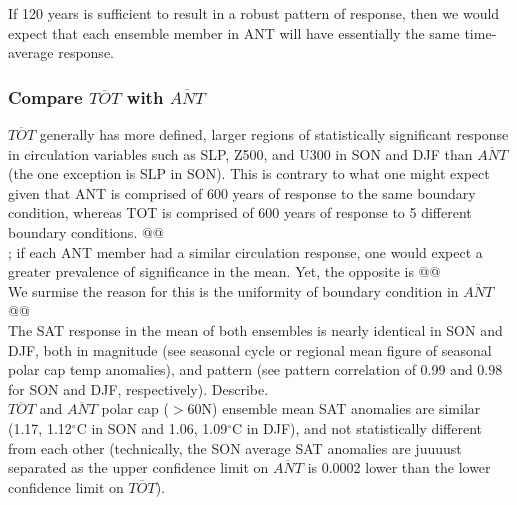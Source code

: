 \documentclass[twocol]{ametsoc}
\begin{document}
If 120 years is sufficient to result in a robust pattern of response, then we would expect that each ensemble member in ANT will have essentially the same time-average response.\\



\subsubsection{Compare $\overline{TOT}$ with $\overline{ANT}$}

$\overline{TOT}$ generally has more defined, larger regions of statistically significant response in circulation variables such as SLP, Z500, and U300 in SON and DJF than $\overline{ANT}$ (the one exception is SLP in SON). This is contrary to what one might expect given that ANT is comprised of 600 years of response to the same boundary condition, whereas TOT is comprised of 600 years of response to 5 different boundary conditions. @@\\

; if each ANT member had a similar circulation response, one would expect a greater prevalence of significance in the mean. Yet, the opposite is @@\\

We surmise the reason for this is the uniformity of boundary condition in $\overline{ANT}$ @@\\

The SAT response in the mean of both ensembles is nearly identical in SON and DJF, both in magnitude (see seasonal cycle or regional mean figure of seasonal polar cap temp anomalies), and pattern (see pattern correlation of 0.99 and 0.98 for SON and DJF, respectively). Describe.\\
$\overline{TOT}$ and $\overline{ANT}$ polar cap ($>$60N) ensemble mean SAT anomalies are similar (1.17, 1.12$^\circ$C in SON and 1.06, 1.09$^\circ$C in DJF), and not statistically different from each other (technically, the SON average SAT anomalies are juuuust separated as the upper confidence limit on $\overline{ANT}$ is 0.0002 lower than the lower confidence limit on $\overline{TOT}$).\\ 
\end{document}
